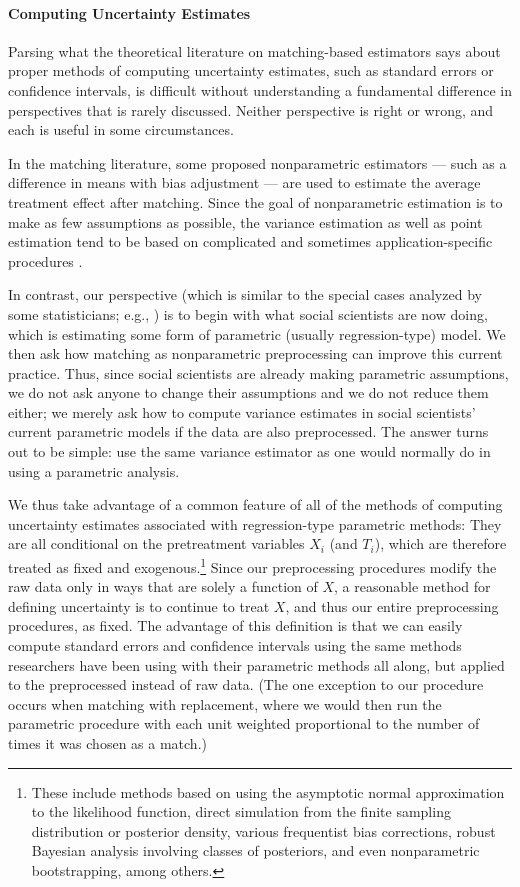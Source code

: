 \documentclass[11pt,titlepage]{article}
\begin{document}
\paragraph{Computing Uncertainty Estimates}

Parsing what the theoretical literature on matching-based estimators
says about proper methods of computing uncertainty estimates, such as
standard errors or confidence intervals, is difficult without
understanding a fundamental difference in perspectives that is rarely
discussed.  Neither perspective is right or wrong, and each is useful
in some circumstances.  

In the matching literature, some proposed nonparametric estimators ---
such as a difference in means with bias adjustment --- are used to
estimate the average treatment effect after matching.  Since the goal
of nonparametric estimation is to make as few assumptions as possible,
the variance estimation as well as point estimation tend to be based
on complicated and sometimes application-specific procedures
\citep[e.g.,][]{AbaImb05}.

In contrast, our perspective (which is similar to the special cases
analyzed by some statisticians; e.g., \citealt{RubTho00}) is to begin
with what social scientists are now doing, which is estimating some
form of parametric (usually regression-type) model.  We then ask how
matching as nonparametric preprocessing can improve this current
practice.  Thus, since social scientists are already making
parametric assumptions, we do not ask anyone to change their
assumptions and we do not reduce them either; we merely ask how to
compute variance estimates in social scientists' current parametric
models if the data are also preprocessed.  The answer turns out to be
simple: use the same variance estimator as one would normally do in
using a parametric analysis.

We thus take advantage of a common feature of all of the methods of
computing uncertainty estimates associated with regression-type
parametric methods: They are all conditional on the pretreatment
variables $X_i$ (and $T_i$), which are therefore treated as fixed and
exogenous.\footnote{These include methods based on using the
  asymptotic normal approximation to the likelihood function, direct
  simulation from the finite sampling distribution or posterior
  density, various frequentist bias corrections, robust Bayesian
  analysis involving classes of posteriors, and even nonparametric
  bootstrapping, among others.}  Since our preprocessing procedures
modify the raw data only in ways that are solely a function of $X$, a
reasonable method for defining uncertainty is to continue to treat
$X$, and thus our entire preprocessing procedures, as fixed.  The
advantage of this definition is that we can easily compute standard
errors and confidence intervals using the same methods researchers
have been using with their parametric methods all along, but applied
to the preprocessed instead of raw data.  (The one exception to our
procedure occurs when matching with replacement, where we would then
run the parametric procedure with each unit weighted proportional to
the number of times it was chosen as a match.)
\end{document}
